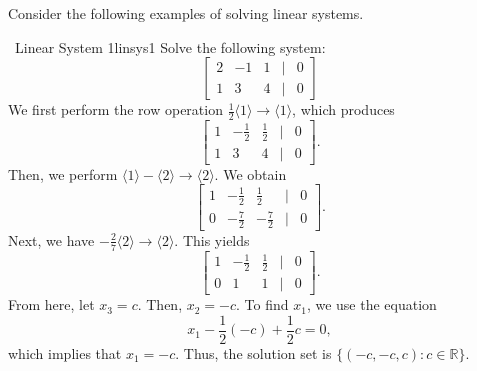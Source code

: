     \pagebreak
    \vphantom
    \\
    \\
    Consider the following examples of solving linear systems.
    \begin{example}{\Difficulty\,\Difficulty\,\,Linear System 1}{linsys1}
        Solve the following system:
        \begin{equation*}
            \begin{bmatrix}
                2 & -1 & 1 & | & 0 \\
                1 & 3 & 4 & | & 0
            \end{bmatrix}
        \end{equation*}
        We first perform the row operation \(\frac{1}{2}\langle 1\rangle\to\langle 1\rangle\), which produces
        \begin{equation*}
            \begin{bmatrix}
                1 & -\frac{1}{2} & \frac{1}{2} & | & 0 \\
                1 & 3 & 4 & | & 0
            \end{bmatrix}.
        \end{equation*}
        Then, we perform \(\langle 1\rangle -\langle 2\rangle\to\langle 2\rangle\). We obtain
        \begin{equation*}
            \begin{bmatrix}
                1 & -\frac{1}{2} & \frac{1}{2} & | & 0 \\
                0 & -\frac{7}{2} & -\frac{7}{2} & | & 0
            \end{bmatrix}.
        \end{equation*}
        Next, we have \(-\frac{2}{7}\langle 2\rangle\to\langle 2\rangle\). This yields
        \begin{equation*}
            \begin{bmatrix}
                1 & -\frac{1}{2} & \frac{1}{2} & | & 0 \\
                0 & 1 & 1 & | & 0
            \end{bmatrix}. 
        \end{equation*}
        From here, let \(x_3=c\). Then, \(x_2=-c\). To find \(x_1\), we use the equation 
        \begin{equation*}
            x_1-\frac{1}{2}(-c)+\frac{1}{2}c=0,
        \end{equation*}
        which implies that \(x_1=-c\). Thus, the solution set is \(\{(-c,-c,c):c\in\mathbb{R}\}\).
    \end{example}
